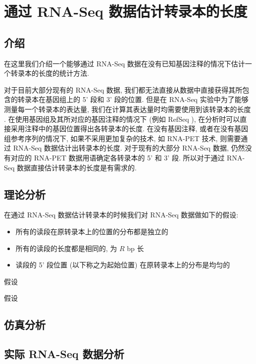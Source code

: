 \chapter{通过 RNA-Seq 数据估计转录本的长度}
\label{chap-lenest}

\section{介绍}
在这里我们介绍一个能够通过 RNA-Seq 数据在没有已知基因注释的情况下估计一个转录本的长度的统计方法. 

对于目前大部分现有的 RNA-Seq 数据, 
我们都无法直接从数据中直接获得其所包含的转录本在基因组上的 5' 段和 3' 段的位置. 
但是在 RNA-Seq 实验中为了能够测量每一个转录本的表达量, 
我们在计算其表达量时均需要使用到该转录本的长度 
\cite{mortazavi2008mapping, Jiang15042009, cufflinks.2010}. 
在使用基因组及其所对应的基因注释的情况下 (例如 RefSeq \cite{_refseq}), 
在分析时可以直接采用注释中的基因位置得出各转录本的长度. 
在没有基因注释, 或者在没有基因组参考序列的情况下, 
如果不采用更加复杂的技术, 如 RNA-PET \cite{Fullwood01042009} 技术, 
则需要通过 RNA-Seq 数据估计出转录本的长度. 对于现有的大部分 RNA-Seq 数据, 
仍然没有对应的 RNA-PET 数据用语确定各转录本的 5' 和 3' 段. 
所以对于通过 RNA-Seq 数据直接估计转录本的长度是有需求的. 

\section{理论分析}
在通过 RNA-Seq 数据估计转录本的时候我们对 RNA-Seq 数据做如下的假设: 
\begin{itemize}
\item 所有的读段在原转录本上的位置的分布都是独立的

\item 所有的读段的长度都是相同的, 为 $R$ bp 长

\item 读段的 5' 段位置 (以下称之为起始位置) 在原转录本上的分布是均匀的
\end{itemize}

\begin{thm}
假设
\end{thm}

\begin{thm}
假设
\end{thm}

\section{仿真分析}

\section{实际 RNA-Seq 数据分析}


